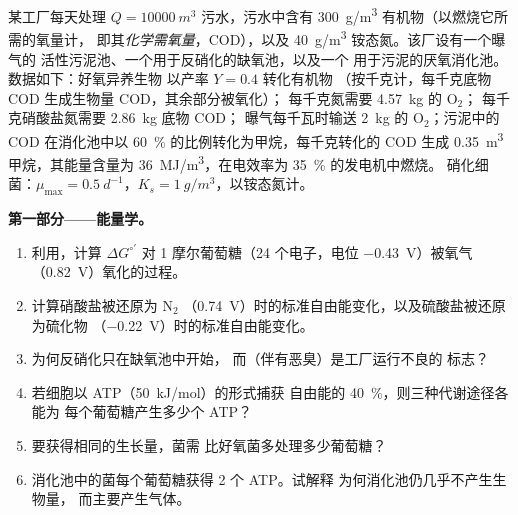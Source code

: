 \begin{problem}
\label{pb:b2:microbial-metabolism:1}
某工厂每天处理 $Q = \qty{10000}{m^3}$ 污水，污水中含有
\qty{300}{g/m^3} 有机物（以燃烧它所需的氧量计，
即其\emph{化学需氧量}，COD），以及
\qty{40}{g/m^3} 铵态氮。该厂设有一个曝气的
活性污泥池、一个用于反硝化的缺氧池，以及一个
用于污泥的厌氧消化池。数据如下：好氧异养生物
以产率 $Y = 0.4$ 转化有机物
（按千克计，每千克底物 COD 生成生物量 COD，其余部分被氧化）；
每千克氮需要 \qty{4.57}{kg} 的 $\mathrm{O_2}$；
每千克硝酸盐氮需要 \qty{2.86}{kg} 底物 COD；
曝气每千瓦时输送 \qty{2}{kg} 的
$\mathrm{O_2}$；污泥中的 COD 在消化池中以
\qty{60}{\%} 的比例转化为甲烷，每千克转化的 COD
生成 \qty{0.35}{m^3} 甲烷，其能量含量为
\qty{36}{MJ/m^3}，在电效率为 \qty{35}{\%} 的发电机中燃烧。
硝化细菌：$\mu_{\max} = \qty{0.5}{d^{-1}}$，$K_s =
\qty{1}{g/m^3}$，以铵态氮计。

\medskip
\noindent\textbf{第一部分——能量学。}
\begin{enumerate}
  \item 利用，计算 $\Delta G^{\circ\prime}$
        对 1 摩尔葡萄糖（24 个电子，电位
        \qty{-0.43}{V}）被氧气（\qty{+0.82}{V}）氧化的过程。
  \item 计算硝酸盐被还原为 $\mathrm{N_2}$
        （\qty{+0.74}{V}）时的标准自由能变化，以及硫酸盐被还原为硫化物
        （\qty{-0.22}{V}）时的标准自由能变化。
  \item 为何反硝化只在缺氧池中开始，
        而（伴有恶臭）是工厂运行不良的
        标志？
  \item 若细胞以 ATP（\qty{50}{kJ/mol}）的形式捕获
        自由能的 \qty{40}{\%}，则三种代谢途径各能为
        每个葡萄糖产生多少个 ATP？
  \item 要获得相同的生长量，菌需
        比好氧菌多处理多少葡萄糖？
  \item 消化池中的菌每个葡萄糖获得 2 个 ATP。试解释
        为何消化池仍几乎不产生生物量，
        而主要产生气体。
\end{enumerate}


\end{problem}

